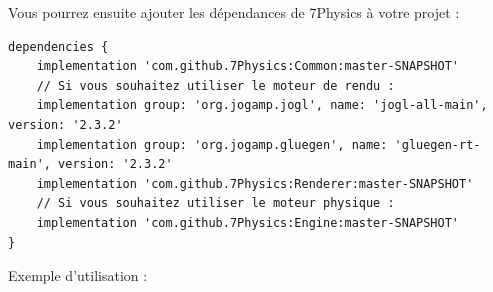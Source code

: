 \documentclass[11pt]{report}
\begin{document}
Vous pourrez ensuite ajouter les dépendances de 7Physics à votre projet :

\begin{verbatim}
dependencies {
    implementation 'com.github.7Physics:Common:master-SNAPSHOT'
    // Si vous souhaitez utiliser le moteur de rendu :
    implementation group: 'org.jogamp.jogl', name: 'jogl-all-main', version: '2.3.2'
    implementation group: 'org.jogamp.gluegen', name: 'gluegen-rt-main', version: '2.3.2'
    implementation 'com.github.7Physics:Renderer:master-SNAPSHOT'
    // Si vous souhaitez utiliser le moteur physique :
    implementation 'com.github.7Physics:Engine:master-SNAPSHOT'
}
\end{verbatim}


Exemple d'utilisation :
\end{document}
